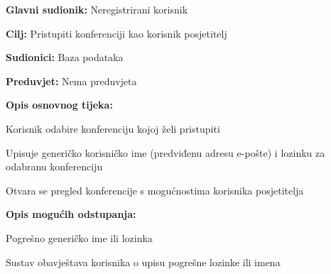 					\noindent {}
					\begin{packed_item}
						
						\item \textbf{Glavni sudionik: } Neregistrirani korisnik
						\item  \textbf{Cilj:} Pristupiti konferenciji kao korisnik posjetitelj
						\item  \textbf{Sudionici:} Baza podataka
						\item  \textbf{Preduvjet:} Nema preduvjeta
						\item  \textbf{Opis osnovnog tijeka:}
						
						\item[] \begin{packed_enum}
							
							\item Korisnik odabire konferenciju kojoj želi pristupiti
							\item Upisuje generičko korisničko ime (predviđenu adresu e-pošte) i lozinku za odabranu konferenciju
							\item Otvara se pregled konferencije s mogućnostima korisnika posjetitelja
						\end{packed_enum}
						
						\item  \textbf{Opis mogućih odstupanja:}
						
						\item[] \begin{packed_item}
							
							\item[2.a] Pogrešno generičko ime ili lozinka
							\item[] \begin{packed_enum}
								
								\item Sustav obavještava korisnika o upisu pogrešne lozinke ili imena
								
							\end{packed_enum}
							
						\end{packed_item}
					\end{packed_item}
					
